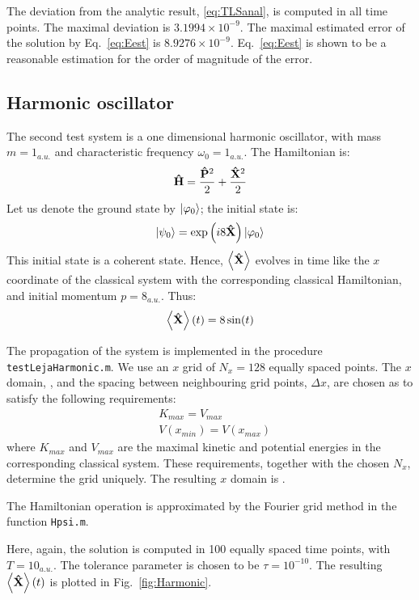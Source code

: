 \documentclass[12pt, a4paper]{article}
\begin{document}
The deviation from the analytic result, \eqref{eq:TLSanal}, is computed in all time points. The maximal deviation is $3.1994\times10^{-9}$. The maximal estimated error of the solution by Eq.~\eqref{eq:Eest} is $8.9276\times10^{-9}$. Eq.~\eqref{eq:Eest} is shown to be a reasonable estimation for the order of magnitude of the error.

\subsection{Harmonic oscillator}
The second test system is a one dimensional harmonic oscillator, with mass $m=1_{a.u.}$ and characteristic frequency $\omega_0=1_{a.u.}$. The Hamiltonian is:
\begin{equation}
	\mathbf{\hat H} = \frac{\mathbf{\hat P}^2}{2} + \frac{\mathbf{\hat X}^2}{2}
\end{equation}
Let us denote the ground state by $\left|\varphi_0\right>$; the initial state is:
\begin{equation}
	\left|\psi_0\right> = \exp\left(i 8 \mathbf{\hat X}\right)\left|\varphi_0\right>
\end{equation}
This initial state is a coherent state. Hence, $\left<\mathbf{\hat X} \right>$ evolves in time like the $x$ coordinate of the classical system with the corresponding classical Hamiltonian, and initial momentum $p=8_{a.u.}$. Thus:
\begin{equation}\label{eq:Harmonicanal}
	\left<\mathbf{\hat X} \right>(t) = 8\sin(t)
\end{equation}

The propagation of the system is implemented in the procedure \texttt{testLejaHarmonic.m}. We use an $x$ grid of $N_x=128$ equally spaced points. The $x$ domain, , and the spacing between neighbouring grid points, $\Delta x$, are chosen as to satisfy the following requirements:
\begin{align}
	& K_{max} = V_{max} \label{eq:gcond1} \\
	& V(x_{min}) = V(x_{max}) \label{eq:gcond2}
\end{align}
where $K_{max}$ and $V_{max}$ are the maximal kinetic and potential energies in the corresponding classical system. These requirements, together with the chosen $N_x$, determine the grid uniquely. The resulting $x$ domain is \text{$[-8\sqrt{\pi},\, 8\sqrt{\pi})$}.

The Hamiltonian operation is approximated by the Fourier grid method in the function \texttt{Hpsi.m}.

Here, again, the solution is computed in 100 equally spaced time points, with $T=10_{a.u.}$. The tolerance parameter is chosen to be $\tau=10^{-10}$. The resulting $\left<\mathbf{\hat X} \right>(t)$ is plotted in Fig.~\ref{fig:Harmonic}.
\end{document}
